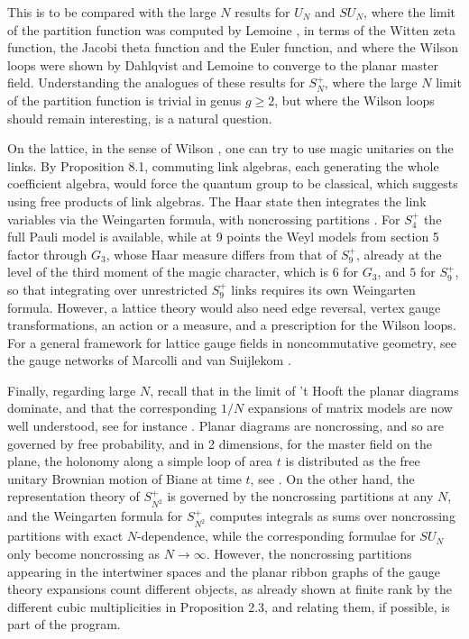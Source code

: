 \documentclass[11pt]{amsart}
\theoremstyle{definition}
\begin{document}
This is to be compared with the large $N$ results for $U_N$ and $SU_N$, where the limit of the partition function was computed by Lemoine \cite{lem}, in terms of the Witten zeta function, the Jacobi theta function and the Euler function, and where the Wilson loops were shown by Dahlqvist and Lemoine \cite{dl1,dl2} to converge to the planar master field. Understanding the analogues of these results for $S_N^+$, where the large $N$ limit of the partition function is trivial in genus $g\geq2$, but where the Wilson loops should remain interesting, is a natural question.

On the lattice, in the sense of Wilson \cite{wil}, one can try to use magic unitaries on the links. By Proposition 8.1, commuting link algebras, each generating the whole coefficient algebra, would force the quantum group to be classical, which suggests using free products of link algebras. The Haar state then integrates the link variables via the Weingarten formula, with noncrossing partitions \cite{bcp}. For $S_4^+$ the full Pauli model is available, while at 9 points the Weyl models from section 5 factor through $G_3$, whose Haar measure differs from that of $S_9^+$, already at the level of the third moment of the magic character, which is $6$ for $G_3$, and $5$ for $S_9^+$, so that integrating over unrestricted $S_9^+$ links requires its own Weingarten formula. However, a lattice theory would also need edge reversal, vertex gauge transformations, an action or a measure, and a prescription for the Wilson loops. For a general framework for lattice gauge fields in noncommutative geometry, see the gauge networks of Marcolli and van Suijlekom \cite{mvs}.

Finally, regarding large $N$, recall that in the limit of 't Hooft \cite{tho} the planar diagrams dominate, and that the corresponding $1/N$ expansions of matrix models are now well understood, see for instance \cite{bgu}. Planar diagrams are noncrossing, and so are governed by free probability, and in 2 dimensions, for the master field on the plane, the holonomy along a simple loop of area $t$ is distributed as the free unitary Brownian motion of Biane \cite{bia} at time $t$, see \cite{ase,lev}. On the other hand, the representation theory of $S_{N^2}^+$ is governed by the noncrossing partitions at any $N$, and the Weingarten formula for $S_{N^2}^+$ computes integrals as sums over noncrossing partitions with exact $N$-dependence, while the corresponding formulae for $SU_N$ only become noncrossing as $N\to\infty$. However, the noncrossing partitions appearing in the intertwiner spaces and the planar ribbon graphs of the gauge theory expansions count different objects, as already shown at finite rank by the different cubic multiplicities in Proposition 2.3, and relating them, if possible, is part of the program.
\end{document}
